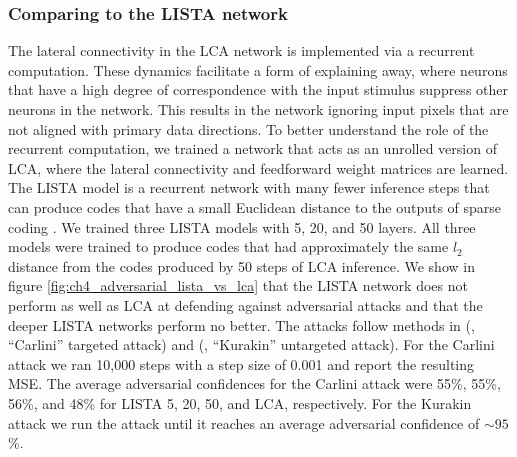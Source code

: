 \subsubsection{Comparing to the LISTA network}
The lateral connectivity in the LCA network is implemented via a recurrent computation. These dynamics facilitate a form of explaining away, where neurons that have a high degree of correspondence with the input stimulus suppress other neurons in the network. This results in the network ignoring input pixels that are not aligned with primary data directions. To better understand the role of the recurrent computation, we trained a network that acts as an unrolled version of LCA, where the lateral connectivity and feedforward weight matrices are learned. The LISTA model is a recurrent network with many fewer inference steps that can produce codes that have a small Euclidean distance to the outputs of sparse coding \parencite{gregor2010learning}. We trained three LISTA models with 5, 20, and 50 layers. All three models were trained to produce codes that had approximately the same $l_{2}$ distance from the codes produced by 50 steps of LCA inference. We show in figure \ref{fig:ch4_adversarial_lista_vs_lca} that the LISTA network does not perform as well as LCA at defending against adversarial attacks and that the deeper LISTA networks perform no better. The attacks follow methods in (\cite{carlini2017towards}, ``Carlini'' targeted attack) and (\cite{kurakin2016adversarial}, ``Kurakin'' untargeted attack). For the Carlini attack we ran 10,000 steps with a step size of 0.001 and report the resulting MSE. The average adversarial confidences for the Carlini attack were 55\%, 55\%, 56\%, and 48\% for LISTA 5, 20, 50, and LCA, respectively. For the Kurakin attack we run the attack until it reaches an average adversarial confidence of $\sim 95$\%. 

